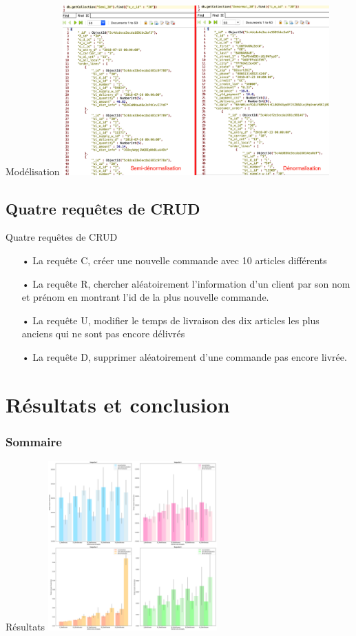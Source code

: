 \documentclass[xcolor=dvipsnames]{beamer}
\begin{document}
\begin{frame}{Modélisation}
		\includegraphics[height = 6.5cm]{images/modelisation.png}
\end{frame}

\subsection{Quatre requêtes de CRUD}
\begin{frame}{Quatre requêtes de CRUD}
	\begin{itemize}
		\item[•] La requête C, créer une nouvelle commande avec 10 articles différents
		\item[•] La requête R, chercher aléatoirement l’information d’un client par son nom et prénom en montrant l’id de la plus nouvelle commande.
		\item[•] La requête U, modifier le temps de livraison des dix articles les plus anciens qui ne sont pas encore délivrés
		\item[•] La requête D, supprimer aléatoirement d’une commande pas encore livrée.
	\end{itemize}
\end{frame}

\section{Résultats et conclusion}
\begin{frame}
\frametitle{Sommaire}
\tableofcontents[currentsection]
\end{frame}

\begin{frame}{Résultats }
		\includegraphics[height = 6.5cm]{images/image_1.png}
\end{frame}
\end{document}
